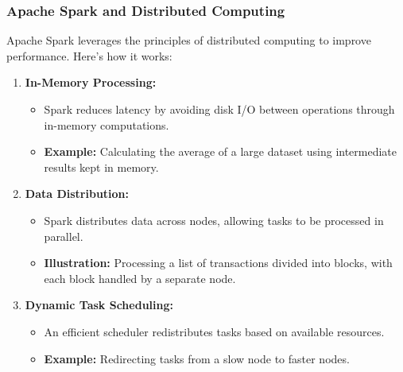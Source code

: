 \documentclass[aspectratio=169]{beamer}
\begin{document}
\begin{frame}[fragile]
    \frametitle{Apache Spark and Distributed Computing}
    Apache Spark leverages the principles of distributed computing to improve performance. Here’s how it works:
    
    \begin{enumerate}
        \item \textbf{In-Memory Processing:}
        \begin{itemize}
            \item Spark reduces latency by avoiding disk I/O between operations through in-memory computations.
            \item \textbf{Example:} Calculating the average of a large dataset using intermediate results kept in memory.
        \end{itemize}
        
        \item \textbf{Data Distribution:}
        \begin{itemize}
            \item Spark distributes data across nodes, allowing tasks to be processed in parallel.
            \item \textbf{Illustration:} Processing a list of transactions divided into blocks, with each block handled by a separate node.
        \end{itemize}
        
        \item \textbf{Dynamic Task Scheduling:}
        \begin{itemize}
            \item An efficient scheduler redistributes tasks based on available resources.
            \item \textbf{Example:} Redirecting tasks from a slow node to faster nodes.
        \end{itemize}
    \end{enumerate}
\end{frame}
\end{document}
